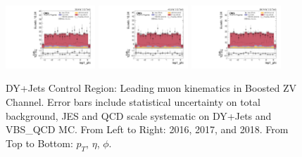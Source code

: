 \begin{figure}[!ht]
  \includegraphics[width=0.30\textwidth]{analysis_plots/2016_zv/cr_vjets_m/lep1_phi.pdf}
  \includegraphics[width=0.30\textwidth]{analysis_plots/2017_zv/cr_vjets_m/lep1_phi.pdf}
  \includegraphics[width=0.30\textwidth]{analysis_plots/2018_zv/cr_vjets_m/lep1_phi.pdf} \\
  \caption[DY+Jets Control Region: Leading muon kinematics in Boosted ZV Channel]%
  {DY+Jets Control Region: Leading muon kinematics in Boosted ZV Channel.
    Error bars include statistical uncertainty on total background,
    JES and QCD scale systematic on DY+Jets and VBS\_QCD MC\@. From Left to Right: 2016,
    2017, and 2018. From Top to Bottom: \( p_T \), \( \eta \), \( \phi \).}%
  \label{fig:zv-cr-vjets-m-lep1-pt-eta-phi}
\end{figure}


